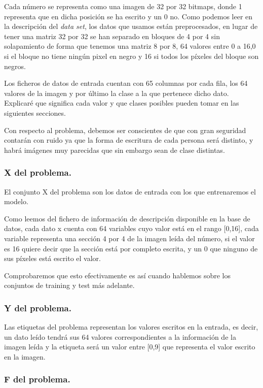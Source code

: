 \documentclass[12pt, spanish]{article}
\begin{document}
Cada número se representa como una imagen de 32 por 32 bitmaps, donde 1 representa que en dicha posición se ha escrito y un 0 no. Como podemos leer en la descripción del \textit{data set}, los datos que usamos están preprocesados, en lugar de tener una matriz 32 por 32 se han separado en bloques de 4 por 4 sin solapamiento de forma que tenemos una matriz 8 por 8, 64 valores entre 0 a 16,0 si el bloque no tiene ningún pixel en negro y 16 si todos los píxeles del bloque son negros.

Los ficheros de datos de entrada cuentan con 65 columnas por cada fila, los 64 valores de la imagen y por último la clase a la que pertenece dicho dato. Explicaré que significa cada valor y que clases posibles pueden tomar en las siguientes secciones.

Con respecto al problema, debemos ser conscientes de que con gran seguridad contarán con ruido ya que la forma de escritura de cada persona será distinto, y habrá imágenes muy parecidas que sin embargo sean de clase distintas.

\subsubsection{X del problema.}

El conjunto X del problema son los datos de entrada con los que entrenaremos el modelo. 

Como leemos del fichero de información de descripción disponible en la base de datos\cite{mlr_digitos}, cada dato x cuenta con 64 variables cuyo valor está en el rango [0,16], cada variable representa una sección 4 por 4 de la imagen leída del número, si el valor es 16 quiere decir que la sección está por completo escrita, y un 0 que ninguno de sus píxeles está escrito el valor.

Comprobaremos que esto efectivamente es así cuando hablemos sobre los conjuntos de training y test más adelante.

\subsubsection{Y del problema.}

Las etiquetas del problema representan los valores escritos en la entrada, es decir, un dato leído tendrá sus 64 valores correspondientes a la información de la imagen leída y la etiqueta será un valor entre [0,9] que representa el valor escrito en la imagen.

\subsubsection{F del problema.}
\end{document}
